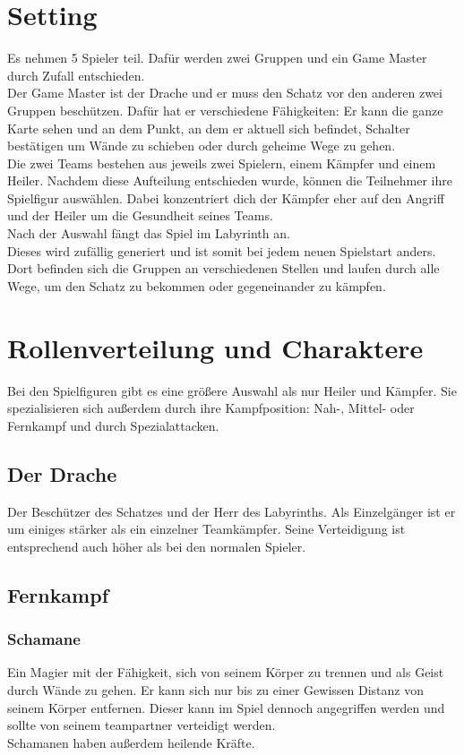 \documentclass[10pt,a4paper,notitlepage]{report}
\begin{document}
\begin{flushleft}
\section{Setting}
Es nehmen 5 Spieler teil. Dafür werden zwei Gruppen und ein Game Master durch Zufall entschieden.\\
Der Game Master ist der Drache und er muss den Schatz vor den anderen zwei Gruppen beschützen. Dafür hat er verschiedene Fähigkeiten: Er kann die ganze Karte sehen und an dem Punkt, an dem er aktuell sich befindet, Schalter bestätigen um Wände zu schieben oder durch geheime Wege zu gehen.\\
Die zwei Teams bestehen aus jeweils zwei Spielern, einem Kämpfer und einem Heiler. Nachdem diese Aufteilung entschieden wurde, können die Teilnehmer ihre Spielfigur auswählen. Dabei konzentriert dich der Kämpfer eher auf den Angriff und der Heiler um die Gesundheit seines Teams.\\
Nach der Auswahl fängt das Spiel im Labyrinth an. \\
Dieses wird zufällig generiert und ist somit bei jedem neuen Spielstart anders. Dort befinden sich die Gruppen an verschiedenen Stellen und laufen durch alle Wege, um den Schatz zu bekommen oder gegeneinander zu kämpfen.\\
\section{Rollenverteilung und Charaktere}
Bei den Spielfiguren gibt es eine größere Auswahl als nur Heiler und Kämpfer. Sie spezialisieren sich außerdem durch ihre Kampfposition: Nah-, Mittel- oder Fernkampf und durch Spezialattacken.\\
\subsection{Der Drache} 
Der Beschützer des Schatzes und der Herr des Labyrinths. Als Einzelgänger ist er um einiges stärker als ein einzelner Teamkämpfer. Seine Verteidigung ist entsprechend auch höher als bei den normalen Spieler.\\
\subsection{Fernkampf}
\subsubsection{Schamane}
Ein Magier mit der Fähigkeit, sich von seinem Körper zu trennen und als Geist durch Wände zu gehen. Er kann sich nur bis zu einer Gewissen Distanz von seinem Körper entfernen. Dieser kann im Spiel dennoch angegriffen werden und sollte von seinem teampartner verteidigt werden.\\
Schamanen haben außerdem heilende Kräfte.\\

\end{flushleft}
\end{document}
